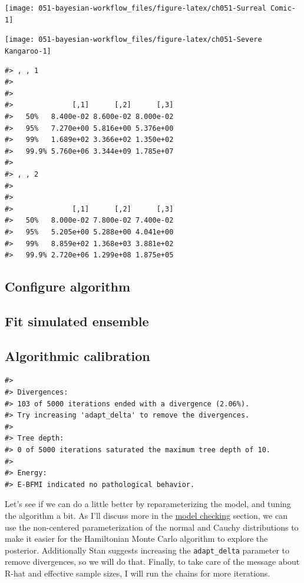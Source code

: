 \documentclass[11pt, oneside, openany]{scrbook}
\begin{document}
\begin{center}\texttt{[image: 051-bayesian-workflow\_files/figure-latex/ch051-Surreal Comic-1]} \end{center}

\begin{center}\texttt{[image: 051-bayesian-workflow\_files/figure-latex/ch051-Severe Kangaroo-1]} \end{center}

\begin{verbatim}
#> , , 1
#> 
#>        
#>              [,1]      [,2]      [,3]
#>   50%   8.400e-02 8.600e-02 8.000e-02
#>   95%   7.270e+00 5.816e+00 5.376e+00
#>   99%   1.689e+02 3.366e+02 1.350e+02
#>   99.9% 5.760e+06 3.344e+09 1.785e+07
#> 
#> , , 2
#> 
#>        
#>              [,1]      [,2]      [,3]
#>   50%   8.000e-02 7.800e-02 7.400e-02
#>   95%   5.205e+00 5.288e+00 4.041e+00
#>   99%   8.859e+02 1.368e+03 3.881e+02
#>   99.9% 2.720e+06 1.299e+08 1.875e+05
\end{verbatim}

\hypertarget{iter2-config-algo}{%
\subsection{Configure algorithm}\label{iter2-config-algo}}

\hypertarget{iter2-fit-sim}{%
\subsection{Fit simulated ensemble}\label{iter2-fit-sim}}

\hypertarget{iter2-algo-calibration}{%
\subsection{Algorithmic calibration}\label{iter2-algo-calibration}}

\begin{verbatim}
#> 
#> Divergences:
#> 103 of 5000 iterations ended with a divergence (2.06%).
#> Try increasing 'adapt_delta' to remove the divergences.
#> 
#> Tree depth:
#> 0 of 5000 iterations saturated the maximum tree depth of 10.
#> 
#> Energy:
#> E-BFMI indicated no pathological behavior.
\end{verbatim}

Let's see if we can do a little better by reparameterizing the model, and tuning the algorithm a bit. As I'll discuss more in the \protect\hyperlink{model-checking}{model checking} section, we can use the non-centered parameterization of the normal and Cauchy distributions to make it easier for the Hamiltonian Monte Carlo algorithm to explore the posterior. Additionally Stan suggests increasing the \texttt{adapt\_delta} parameter to remove divergences, so we will do that. Finally, to take care of the message about R-hat and effective sample sizes, I will run the chains for more iterations.
\end{document}
